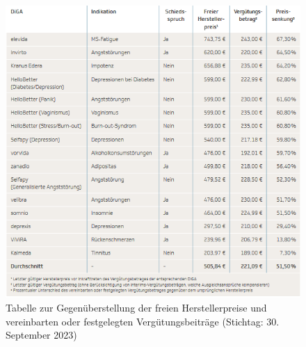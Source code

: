 \documentclass{article}
\begin{document}
			\begin{figure}[htbp]
				\includegraphics[width=\textwidth]{./grafiken/tabelle_preise_diga}
				\caption[Gegenüberstellung der freien Herstellerpreise und verinbarten oder festgelegten Vergütungsbeiträge]{Tabelle zur Gegenüberstellung der freien Herstellerpreise und vereinbarten oder festgelegten Vergütungsbeiträge (Stichtag: 30. September 2023)}
				\label{Tab-preise-diga}
			\end{figure}
\end{document}
